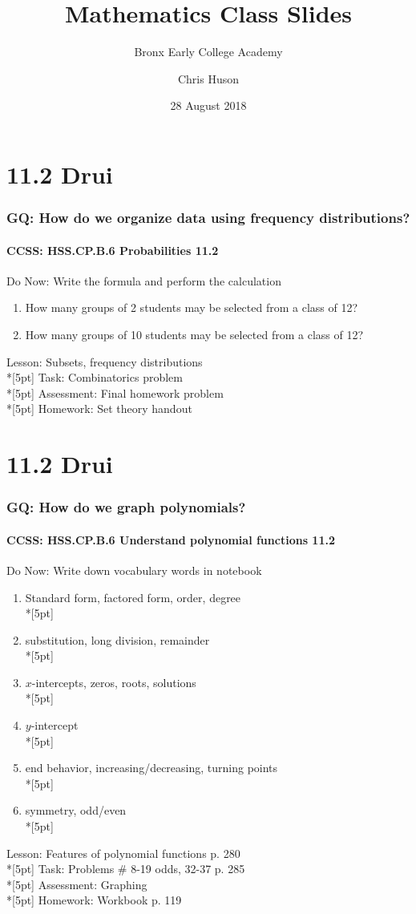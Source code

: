 \documentclass{beamer}
\title{Mathematics Class Slides}
\subtitle{Bronx Early College Academy}
\author{Chris Huson}
\date{28 August 2018}
\begin{document}
\frame{\titlepage}



\section{11.2 Drui}
\frame
{
  \frametitle{GQ: How do we organize data using frequency distributions?}
  \framesubtitle{CCSS: HSS.CP.B.6 Probabilities \qquad \qquad \qquad \alert{11.2}}

  \begin{block}{Do Now: Write the formula and perform the calculation}
  \begin{enumerate}
      \item How many groups of 2 students may be selected from a class of 12?
      \item How many groups of 10 students may be selected from a class of 12?
  \end{enumerate}
  \end{block}
  Lesson: Subsets, frequency distributions\\*[5pt]
  Task: Combinatorics problem\\*[5pt]
  Assessment: Final homework problem\\*[5pt]
  Homework: Set theory handout
}

\section{11.2 Drui}
\frame
{
  \frametitle{GQ: How do we graph polynomials?}
  \framesubtitle{CCSS: HSS.CP.B.6 Understand polynomial functions \qquad \qquad \qquad \alert{11.2}}

  \begin{block}{Do Now: Write down vocabulary words in notebook}
  \begin{enumerate}
    \item Standard form, factored form, order, degree\\*[5pt]
    \item substitution, long division, remainder\\*[5pt]
    \item $x$-intercepts, zeros, roots, solutions\\*[5pt]
    \item $y$-intercept\\*[5pt]
    \item end behavior, increasing/decreasing, turning points\\*[5pt]
    \item symmetry, odd/even\\*[5pt]
  \end{enumerate}
  \end{block}
  Lesson: Features of polynomial functions p. 280\\*[5pt]
  Task: Problems \# 8-19 odds, 32-37 p. 285\\*[5pt]
  Assessment: Graphing\\*[5pt]
  Homework: Workbook p. 119
}
\end{document}
